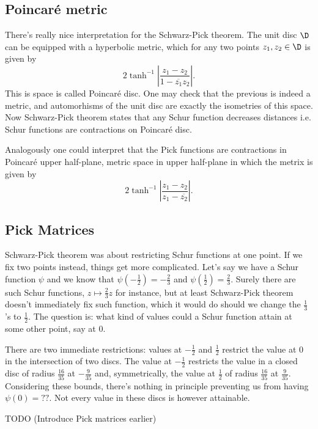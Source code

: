 \subsection{Poincaré metric}

There's really nice interpretation for the Schwarz-Pick theorem. The unit disc $\D$ can be equipped with a hyperbolic metric, which for any two points $z_{1}, z_{2} \in \D$ is given by
\[
	2 \tanh^{-1}\left|\frac{z_{1} - z_{2}}{1 - \overline{z_{1}} z_{2}}\right|.
\]
This is space is called Poincaré disc. One may check that the previous is indeed a metric, and automorhisms of the unit disc are exactly the isometries of this space. Now Schwarz-Pick theorem states that any Schur function decreases distances i.e. Schur functions are contractions on Poincaré disc.

Analogously one could interpret that the Pick functions are contractions in Poincaré upper half-plane, metric space in upper half-plane in which the metrix is given by
\[
	2 \tanh^{-1}\left|\frac{z_{1} - z_{2}}{z_{1} - \overline{z_{2}}}\right|.
\]

\subsection{Pick Matrices}

Schwarz-Pick theorem was about restricting Schur functions at one point. If we fix two points instead, things get more complicated. Let's say we have a Schur function $\psi$ and we know that $\psi(-\frac{1}{2}) = -\frac{2}{3}$ and $\psi(\frac{1}{2}) = \frac{2}{3}$. Surely there are such Schur functions, $z \mapsto \frac{2}{3}z$ for instance, but at least Schwarz-Pick theorem doesn't immediately fix such function, which it would do should we change the $\frac{1}{3}$'s to $\frac{1}{2}$. The question is: what kind of values could a Schur function attain at some other point, say at $0$.

There are two immediate restrictions: values at $-\frac{1}{2}$ and $\frac{1}{2}$ restrict the value at $0$ in the intersection of two discs. The value at $-\frac{1}{2}$ restricts the value in a closed disc of radius $\frac{16}{35}$ at $-\frac{9}{35}$ and, symmetrically, the value at $\frac{1}{2}$ of radius $\frac{16}{35}$ at $\frac{9}{35}$. Considering these bounds, there's nothing in principle preventing us from having $\psi(0) = ??$. Not every value in these discs is however attainable. 

TODO (Introduce Pick matrices earlier)

